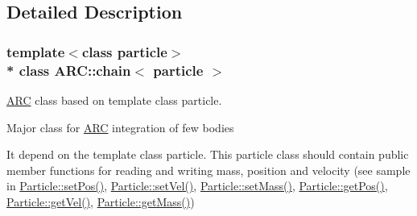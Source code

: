 \subsection{Detailed Description}
\subsubsection*{template$<$class particle$>$\\*
class A\+R\+C\+::chain$<$ particle $>$}

\hyperlink{namespaceARC}{A\+RC} class based on template class particle. 

Major class for \hyperlink{namespaceARC}{A\+RC} integration of few bodies

It depend on the template class particle. This particle class should contain public member functions for reading and writing mass, position and velocity (see sample in \hyperlink{classParticle_a97d76b66aed57834c105b78b10643b81}{Particle\+::set\+Pos()}, \hyperlink{classParticle_a07c405254ac3f03854e7523ff473c828}{Particle\+::set\+Vel()}, \hyperlink{classParticle_a620f479862b90468a77da4e9cf5c0ff5}{Particle\+::set\+Mass()}, \hyperlink{classParticle_abe0e7a4726615f08d4f5119c6f0fd6aa}{Particle\+::get\+Pos()}, \hyperlink{classParticle_af4fc2ad393343867b02534d4a75659f0}{Particle\+::get\+Vel()}, \hyperlink{classParticle_ad55c2cb0a6e50a48de72d6c324b00d44}{Particle\+::get\+Mass()})

